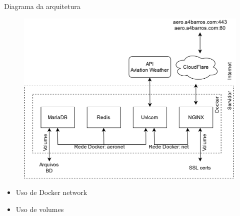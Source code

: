 \documentclass{beamer}
\begin{document}
\begin{frame}{Diagrama da arquitetura}
    \begin{figure}[ht]
        \begin{center}
        \includegraphics[width=0.6\linewidth]{img/arquitetura.png}
        \label{fig:arquitetura}
        \end{center}
    \end{figure}
    \pause
    \begin{itemize}
        \item Uso de Docker network
        \item Uso de volumes
    \end{itemize}
\end{frame}
\end{document}
